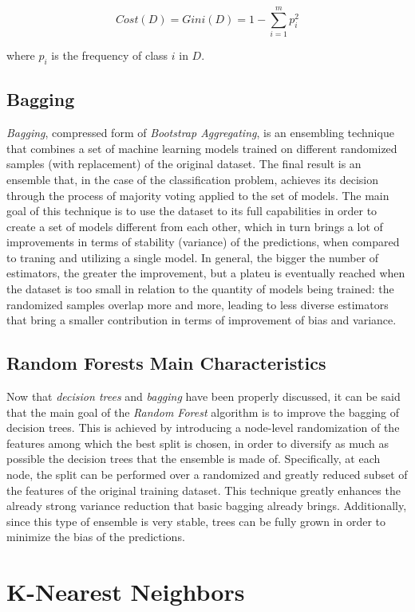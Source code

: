 $$
Cost(D) = Gini(D) = 1 - \sum_{i=1}^m{p_i^2}
$$

where $p_i$ is the frequency of class $i$ in $D$.

\subsection{Bagging}

\textit{Bagging}, compressed form of \textit{Bootstrap Aggregating}, is an ensembling technique that combines a set of machine learning models trained on different randomized samples (with replacement) of the original dataset. The final result is an ensemble that, in the case of the classification problem, achieves its decision through the process of majority voting applied to the set of models.
The main goal of this technique is to use the dataset to its full capabilities in order to create a set of models different from each other, which in turn brings a lot of improvements in terms of stability (variance) of the predictions, when compared to traning and utilizing a single model.
In general, the bigger the number of estimators, the greater the improvement, but a plateu is eventually reached when the dataset is too small in relation to the quantity of models being trained: the randomized samples overlap more and more, leading to less diverse estimators that bring a smaller contribution in terms of improvement of bias and variance.

\subsection{Random Forests Main Characteristics}

Now that \textit{decision trees} and \textit{bagging} have been properly discussed, it can be said that the main goal of the \textit{Random Forest} algorithm is to improve the bagging of decision trees. This is achieved by introducing a node-level randomization of the features among which the best split is chosen, in order to diversify as much as possible the decision trees that the ensemble is made of. Specifically, at each node, the split can be performed over a randomized and greatly reduced subset of the features of the original training dataset. This technique greatly enhances the already strong variance reduction that basic bagging already brings. Additionally, since this type of ensemble is very stable, trees can be fully grown in order to minimize the bias of the predictions.

\break
\section{K-Nearest Neighbors}

